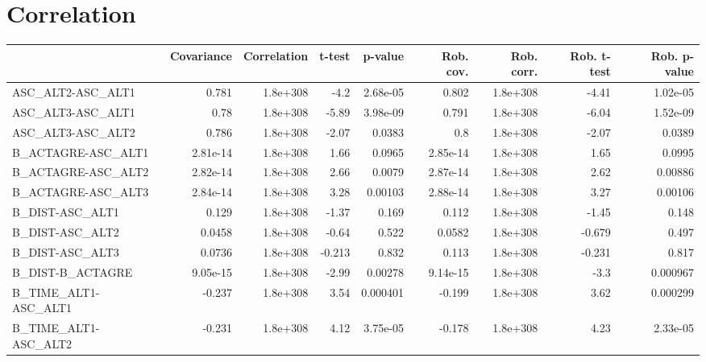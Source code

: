 \section{Correlation}
\begin{tabular}{lrrrrrrrr}
\toprule
{} &  Covariance &  Correlation &    t-test &  p-value &  Rob. cov. &  Rob. corr. &  Rob. t-test &  Rob. p-value \\
\midrule
ASC\_ALT2-ASC\_ALT1                 &       0.781 &     1.8e+308 &      -4.2 & 2.68e-05 &      0.802 &    1.8e+308 &        -4.41 &      1.02e-05 \\
ASC\_ALT3-ASC\_ALT1                 &        0.78 &     1.8e+308 &     -5.89 & 3.98e-09 &      0.791 &    1.8e+308 &        -6.04 &      1.52e-09 \\
ASC\_ALT3-ASC\_ALT2                 &       0.786 &     1.8e+308 &     -2.07 &   0.0383 &        0.8 &    1.8e+308 &        -2.07 &        0.0389 \\
B\_ACTAGRE-ASC\_ALT1                &    2.81e-14 &     1.8e+308 &      1.66 &   0.0965 &   2.85e-14 &    1.8e+308 &         1.65 &        0.0995 \\
B\_ACTAGRE-ASC\_ALT2                &    2.82e-14 &     1.8e+308 &      2.66 &   0.0079 &   2.87e-14 &    1.8e+308 &         2.62 &       0.00886 \\
B\_ACTAGRE-ASC\_ALT3                &    2.84e-14 &     1.8e+308 &      3.28 &  0.00103 &   2.88e-14 &    1.8e+308 &         3.27 &       0.00106 \\
B\_DIST-ASC\_ALT1                   &       0.129 &     1.8e+308 &     -1.37 &    0.169 &      0.112 &    1.8e+308 &        -1.45 &         0.148 \\
B\_DIST-ASC\_ALT2                   &      0.0458 &     1.8e+308 &     -0.64 &    0.522 &     0.0582 &    1.8e+308 &       -0.679 &         0.497 \\
B\_DIST-ASC\_ALT3                   &      0.0736 &     1.8e+308 &    -0.213 &    0.832 &      0.113 &    1.8e+308 &       -0.231 &         0.817 \\
B\_DIST-B\_ACTAGRE                  &    9.05e-15 &     1.8e+308 &     -2.99 &  0.00278 &   9.14e-15 &    1.8e+308 &         -3.3 &      0.000967 \\
B\_TIME\_ALT1-ASC\_ALT1              &      -0.237 &     1.8e+308 &      3.54 & 0.000401 &     -0.199 &    1.8e+308 &         3.62 &      0.000299 \\
B\_TIME\_ALT1-ASC\_ALT2              &      -0.231 &     1.8e+308 &      4.12 & 3.75e-05 &     -0.178 &    1.8e+308 &         4.23 &      2.33e-05 \\

\end{tabular}
